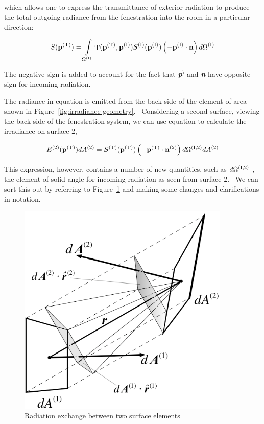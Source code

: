 which allows one to express the transmittance of exterior radiation to produce the total outgoing radiance from the fenestration into the room in a particular direction:

\begin{equation}
S({{\bf{p}}^{{\rm{(T)}}}}) = \int\limits_{{\Omega ^{{\rm{(I)}}}}} {{\mathop{\rm T}\nolimits} ({{\bf{p}}^{{\rm{(T)}}}},{{\bf{p}}^{{\rm{(I)}}}}){S^{{\rm{(I)}}}}({{\bf{p}}^{{\rm{(I)}}}})\left( { - {{\bf{p}}^{{\rm{(I)}}}}\cdot {\bf{n}}} \right)d{\Omega ^{{\rm{(I)}}}}}
\end{equation}

The negative sign is added to account for the fact that \textbf{\emph{p}}\(^{)}\) and \textbf{\emph{n}} have opposite sign for incoming radiation.

The radiance in equation is emitted from the back side of the element of area shown in Figure~\ref{fig:irradiance-geometry}.~ Considering a second surface, viewing the back side of the fenestration system, we can use equation to calculate the irradiance on surface 2,

\begin{equation}
{E^{{\rm{(2)}}}}({{\bf{p}}^{{\rm{(T)}}}})d{A^{{\rm{(2)}}}} = {S^{{\rm{(T)}}}}({{\bf{p}}^{{\rm{(T)}}}})\left( { - {{\bf{p}}^{{\rm{(T)}}}}\cdot {{\bf{n}}^{{\rm{(2)}}}}} \right)d{\Omega ^{{\rm{(I,2)}}}}d{A^{{\rm{(2)}}}}
\end{equation}

This expression, however, contains a number of new quantities, such as \(d{\Omega ^{{\rm{(I,2)}}}}\) , the element of solid angle for incoming radiation as seen from surface 2.~ We can sort this out by referring to Figure~\ref{fig:radiation-exchange-between-two-surface} and making some changes and clarifications in notation.

\begin{figure}[hbtp] %
\centering
\includegraphics[width=0.9\textwidth, height=0.9\textheight, keepaspectratio=true]{media/image1275.png}
\caption{Radiation exchange between two surface elements \protect \label{fig:radiation-exchange-between-two-surface}}
\end{figure}

